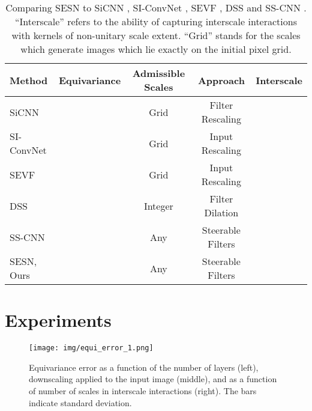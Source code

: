 \documentclass{article} \usepackage{multirow}
\newcommand{\cmark}{\ding{51}}\newcommand{\xmark}{\ding{55}}
\begin{document}
\begin{table}[t]
    \begin{center}
    \begin{tabular}{l|cccc}
    \toprule
    Method     & Equivariance & Admissible Scales & Approach          & Interscale  \\ \midrule
    SiCNN      & \cmark       & Grid              & Filter Rescaling  & \xmark                 \\
    SI-ConvNet & \xmark       & Grid              & Input Rescaling   & \xmark                 \\
    SEVF       & \cmark       & Grid              & Input Rescaling   & \cmark                 \\
    DSS        & \cmark       & Integer           & Filter Dilation  & \cmark                 \\
    SS-CNN     & \xmark       & Any               & Steerable Filters & \xmark                 \\ \midrule
    SESN, Ours & \cmark       & Any               & Steerable Filters & \cmark                 \\ \bottomrule
    \end{tabular}
    \end{center}
    \caption{Comparing SESN to SiCNN \citet{xu2014scale}, SI-ConvNet \citet{kanazawa2014locally}, 
    SEVF \citet{marcos2018scale}, DSS \citet{worrall2019deep} and SS-CNN \citet{ghosh2019scale}.
    ``Interscale'' refers to the ability of capturing interscale interactions with kernels of non-unitary scale extent.
    ``Grid'' stands for the scales which generate images which lie exactly on the initial pixel grid. }
    \label{tab:comparison}
\end{table}


 \section{Experiments}
\label{sec:experiments}

\begin{figure}[h]
    \begin{center}
        \texttt{[image: img/equi\_error\_1.png]}
    \end{center}
    \caption{Equivariance error  as a function of the number of layers (left), downscaling applied to the input image (middle),
    and as a function of number of scales in interscale interactions (right). The bars indicate standard deviation.}
    \label{fig:equi_error}
\end{figure}
\end{document}
